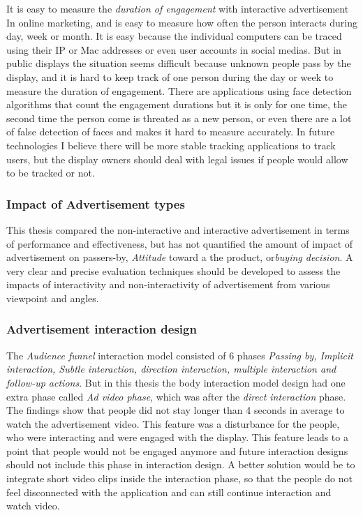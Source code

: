 It is easy to measure the \emph{duration of engagement} with interactive advertisement In online marketing, and is easy to measure how often the person interacts during day, week or month. It is easy because the individual computers can be traced using their IP or Mac addresses or even user accounts in social medias. But in public displays the situation seems difficult because unknown people pass by the display, and it is hard to keep track of one person during the day or week to measure the duration of engagement. There are applications \cite{glancingcount} using face detection algorithms that count the engagement durations but it is only for one time, the second time the person come is threated as a new person, or even there are a lot of false detection of faces and makes it hard to measure accurately. In future technologies I believe there will be more stable tracking applications to track users, but the display owners should deal with legal issues if people would allow to be tracked or not. 

\subsubsection{Impact of Advertisement types}
This thesis compared the non-interactive and interactive advertisement in terms of performance and effectiveness, but has not quantified the amount of impact of advertisement on passers-by, \emph{Attitude} toward a the product, or\emph{buying decision}. A very clear and precise evaluation techniques should be developed to assess the impacts of interactivity and non-interactivity of advertisement from various viewpoint and angles.

\subsubsection{Advertisement interaction design}
The \emph{Audience funnel}\cite{AudienceFunnel} interaction model consisted of 6 phases \emph{Passing by, Implicit interaction, Subtle interaction, direction interaction, multiple interaction and follow-up actions}. But in this thesis the body interaction model design had one extra phase called \emph{Ad video phase}, which was after the \emph{direct interaction} phase. The findings show that people did not stay longer than 4 seconds in average to watch the advertisement video. This feature was a disturbance for the people, who were interacting and were engaged with the display. This feature leads to a point that people would not be engaged anymore and future interaction designs should not include this phase in interaction design. A better solution would be to integrate short video clips inside the interaction phase, so that the people do not feel disconnected with the application and can still continue interaction and watch video.

